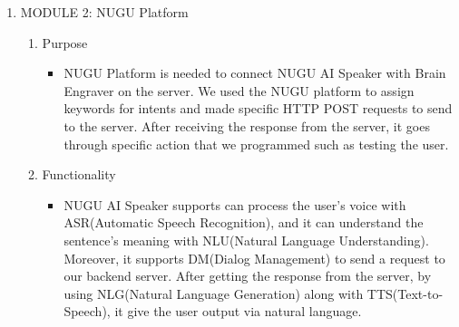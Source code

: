 \documentclass[conference]{IEEEtran}
\begin{document}
\begin{enumerate}
        \item MODULE 2: NUGU Platform
            \begin{enumerate}
            \item Purpose
                \begin{itemize}
                    \item NUGU Platform is needed to connect NUGU AI Speaker with Brain Engraver on the server. We used the NUGU platform to assign keywords for intents and made specific HTTP POST requests to send to the server. After receiving the response from the server, it goes through specific action that we programmed such as testing the user.
                \end{itemize}
            \item Functionality
                \begin{itemize}
                    \item NUGU AI Speaker supports can process the user's voice with ASR(Automatic Speech Recognition), and it can understand the sentence's meaning with NLU(Natural Language Understanding). Moreover, it supports DM(Dialog Management) to send a request to our backend server. After getting the response from the server, by using NLG(Natural Language Generation) along with TTS(Text-to-Speech), it give the user output via natural language.
                \end{itemize}
            \end{enumerate}
            

\end{enumerate}
\end{document}
